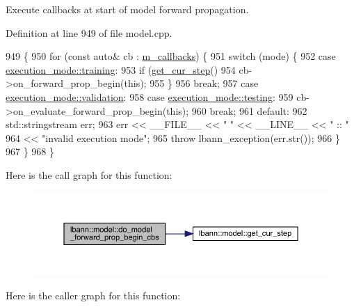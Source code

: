 Execute callbacks at start of model forward propagation. 

Definition at line 949 of file model.\+cpp.


\begin{DoxyCode}
949                                                                \{
950   \textcolor{keywordflow}{for} (\textcolor{keyword}{const} \textcolor{keyword}{auto}& cb : \hyperlink{classlbann_1_1model_a07b511fef30368494c2ad80922ffd0eb}{m\_callbacks}) \{
951     \textcolor{keywordflow}{switch} (mode) \{
952     \textcolor{keywordflow}{case} \hyperlink{base_8hpp_a2781a159088df64ed7d47cc91c4dc0a8ac185ddac8b5a8f5aa23c5b80bc12d214}{execution\_mode::training}:
953       \textcolor{keywordflow}{if} (\hyperlink{classlbann_1_1model_ad0cdcba177434b52dc9c4a97be183a92}{get\_cur\_step}() %
954         cb->on\_forward\_prop\_begin(\textcolor{keyword}{this});
955       \}
956       \textcolor{keywordflow}{break};
957     \textcolor{keywordflow}{case} \hyperlink{base_8hpp_a2781a159088df64ed7d47cc91c4dc0a8aa617908b172c473cb8e8cda059e55bf0}{execution\_mode::validation}:
958     \textcolor{keywordflow}{case} \hyperlink{base_8hpp_a2781a159088df64ed7d47cc91c4dc0a8aae2b1fca515949e5d54fb22b8ed95575}{execution\_mode::testing}:
959       cb->on\_evaluate\_forward\_prop\_begin(\textcolor{keyword}{this});
960       \textcolor{keywordflow}{break};
961     \textcolor{keywordflow}{default}:
962       std::stringstream err;
963       err << \_\_FILE\_\_ << \textcolor{stringliteral}{" "} << \_\_LINE\_\_ << \textcolor{stringliteral}{" :: "}
964           << \textcolor{stringliteral}{"invalid execution mode"};
965       \textcolor{keywordflow}{throw} lbann\_exception(err.str());
966     \}
967   \}
968 \}
\end{DoxyCode}
Here is the call graph for this function\+:\nopagebreak
\begin{figure}[H]
\begin{center}
\leavevmode
\includegraphics[width=350pt]{classlbann_1_1model_af3c45642bbacf1bd07e8504d7e689ec0_cgraph}
\end{center}
\end{figure}
Here is the caller graph for this function\+:\nopagebreak
